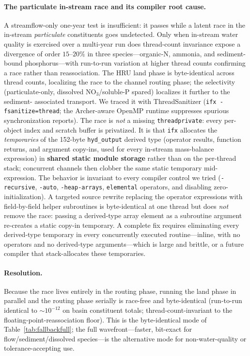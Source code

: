 \documentclass[12pt]{article}
\begin{document}
\paragraph{The particulate in-stream race and its compiler root cause.} A streamflow-only one-year
test is insufficient: it passes while a latent race in the in-stream \emph{particulate}
constituents goes undetected. Only when in-stream water quality is exercised over a multi-year run
does thread-count invariance expose a divergence of order $15$--$20\%$ in three
species---organic-N, ammonia, and sediment-bound phosphorus---with run-to-run variation at higher
thread counts confirming a race rather than reassociation. The HRU land phase is byte-identical
across thread counts, localizing the race to the channel routing phase; the selectivity
(particulate-only, dissolved NO$_3$/soluble-P spared) localizes it further to the sediment-
associated transport. We traced it with ThreadSanitizer (\texttt{ifx -fsanitize=thread}; the
Archer-aware OpenMP runtime suppresses spurious synchronization reports). The race is \emph{not} a
missing \texttt{threadprivate}: every per-object index and scratch buffer is privatized. It is that
\texttt{ifx} allocates the \emph{temporaries} of the 152-byte \texttt{hyd\_output} derived type
(operator results, function returns, and argument copy-ins, used for every in-stream mass-balance
expression) in \textbf{shared static module storage} rather than on the per-thread stack;
concurrent channels then clobber the same static temporary mid-expression. The behavior is
invariant to every compiler control we tried (\texttt{-recursive}, \texttt{-auto},
\texttt{-heap-arrays}, \texttt{elemental} operators, and disabling zero-initialization). A targeted
source rewrite replacing the operator expressions with field-by-field helper subroutines is
byte-identical at one thread but does \emph{not} remove the race: passing a derived-type array
element as a subroutine argument re-creates a static copy-in temporary. A complete fix requires
eliminating every derived-type temporary in every concurrently executed routine---inline, with no
operators and no derived-type arguments---which is large and brittle, or a future compiler that
stack-allocates these temporaries.

\paragraph{Resolution.} Because the race lives entirely in the routing phase, running the land
phase in parallel and the routing phase serially is race-free and byte-identical (run-to-run
identical to $\sim$$10^{-12}$ on basin constituent totals; thread-count-invariant to the
floating-point-reassociation floor). This is the byte-identical mode of Table~\ref{tab:fallbackfull};
the full wavefront---faster, bit-exact for flow/sediment/dissolved species---is the alternative
mode for non-water-quality or tolerance-accepting use.
\end{document}
